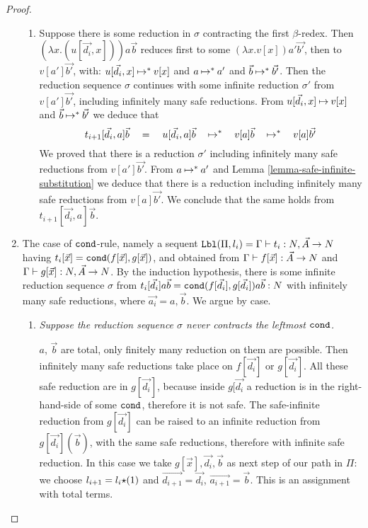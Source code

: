 \begin{proof}
\begin{enumerate}
\begin{enumerate}
\item
 Suppose there is some reduction in $\sigma$ contracting the first $\beta$-redex.
 Then  $(\lambda x.(u[\vec{d_i},x]))a\vec{b}$ reduces first to some
 $ (\lambda x.v[x])a'\vec{b'}$, then to $v[a']\vec{b'}$, with: 
 $u[\vec{d_i},x] \mathbin{\mapsto}^* v[x]$ and $a\mathbin{\mapsto}^* a'$ and $\vec{b} \mathbin{\mapsto}^* \vec{b'}$.
 Then the reduction sequence $\sigma$ continues 
  with some infinite reduction $\sigma'$ from $v[a']\vec{b'}$, including infinitely many safe reductions. 
 From $u[\vec{d_i},x] \mathbin{\mapsto} v[x]$ and $\vec{b} \mathbin{\mapsto}^* \vec{b'}$ we deduce that 
$$
        		t_{i+1}[\vec{d_i},a]\vec{b}  
\ \ \ 		=
\ \ \     u[\vec{d_i},a]\vec{b} 
\ \ \    \mathbin{\mapsto}^*
\ \ \    v[a]\vec{b}
\ \ \    \mathbin{\mapsto}^*
 \ \ \   v[a]\vec{b'}
$$ 
 We proved that there is a reduction $\sigma'$ including infinitely many safe reductions from  $v[a']\vec{b'}$.
 From $a \mathbin{\mapsto}^* a'$ and Lemma \ref{lemma-safe-infinite-substitution} 
 we deduce that there is a reduction including infinitely many safe reductions from  $v[a]\vec{b'}$.
 We conclude that the same holds from  $t_{i+1}[\vec{d_i},a]\vec{b}$.
\end{enumerate}



\item
  The case of ${\tt cond}$-rule, namely a sequent
  ${\tt Lbl}(\Pi,l_i) = \Gamma\vdash t_i:{N},\vec{A}\rightarrow{N}$
  having $t_i[\vec{x}] = {\tt cond}(f[\vec{x}],g[\vec{x}])$,
  and obtained from 
  $\Gamma\vdash f[\vec{x}]:\vec{A}\rightarrow{N}$
  and
  $\Gamma\vdash g[\vec{x}]:{N},\vec{A}\rightarrow{N}$. 
  By the induction hypothesis, there is some infinite reduction sequence $\sigma$ from
  $t_i[\vec{d_i}]a \vec{b} = {\tt cond}(f[\vec{d_i}],g[\vec{d_i}])a\vec{b}:{N}$
  with infinitely many safe reductions,
  where $\vec{a_i} = a,\vec{b}$. 
  We argue by case.

\begin{enumerate}
\item
  \emph{Suppose the reduction sequence $\sigma$ never contracts the leftmost ${\tt cond}$.}

  $a$, $\vec{b}$ are total, only finitely many reduction on them are possible.
  Then infinitely many safe reductions take place on $f[\vec{d_i}]$ or $g[\vec{d_i}]$. 
  All these safe reduction are in $g[\vec{d_i}]$, because inside $g[\vec{d_i}$ 
  a reduction is in the right-hand-side of some ${\tt cond}$, therefore it is not safe.
  The safe-infinite reduction from $g[\vec{d_i}]$ can be raised to an infinite reduction from 
  $g[\vec{d_i}](\vec{b})$, with the same safe reductions, therefore with infinite safe reduction.
  In this case we take $g[\vec{x}],\vec{d_i},\vec{b}$ as next step of our path in $\Pi$:
  we choose $l_{i+1} = l_i {\star} (1)$ and $\vec{d_{i+1}} = \vec{d_i}$,
  $\vec{a_{i+1}} = \vec{b}$.  This is an assignment with total terms.


\end{enumerate}
\end{enumerate}
\end{proof}

